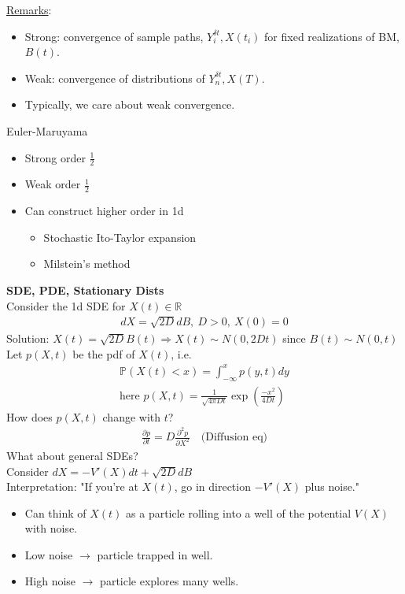 \documentclass[12pt, letterpaper]{article}
\begin{document}
\underline{Remarks}:
\begin{itemize}
    \item Strong: convergence of sample paths, $Y_i^{\delta t}, X(t_i)$ for fixed realizations
    of BM, $B(t)$.
    \item Weak: convergence of distributions of $Y_n^{\delta t}, X(T)$.
    \item Typically, we care about weak convergence.
\end{itemize}
 Euler-Maruyama
\begin{itemize}
    \item Strong order $\frac{1}{2}$
    \item Weak order $\frac{1}{2}$
    \item Can construct higher order in 1d
    \begin{itemize}
        \item Stochastic Ito-Taylor expansion
        \item Milstein's method
    \end{itemize}
\end{itemize}
\textbf{SDE, PDE, Stationary Dists}\\
Consider the 1d SDE for $X(t) \in \mathbb{R}$
\begin{align*}
    dX = \sqrt{2D}dB,\ D>0,\ X(0) = 0
\end{align*}
Solution: $X(t) = \sqrt{2D}B(t) \Rightarrow X(t) \sim N(0,2Dt)$ since $B(t) \sim N(0,t)$ \\
Let $p(X,t)$ be the pdf of $X(t)$, i.e. 
\begin{align*}
    \mathbb{P}(X(t) < x) = \int_{-\infty}^{x}p(y,t)dy \\
    \text{here } p(X,t) = \frac{1}{\sqrt{4\pi Dt}} \exp (\frac{-x^2}{4Dt})
\end{align*}
How does $p(X,t)$ change with $t$?
\begin{align*}
    \frac{\partial p}{\partial t} = D\frac{\partial^2 p}{\partial X^2} \quad \text{(Diffusion eq)}
\end{align*}
What about general SDEs? \\
Consider $dX = -V'(X)dt + \sqrt{2D}dB$ \\
Interpretation: "If you're at $X(t)$, go in direction $-V'(X)$ plus noise."
\begin{itemize}
    \item Can think of $X(t)$ as a particle rolling into a well of the potential $V(X)$ with noise.
    \item Low noise $\rightarrow$ particle trapped in well.
    \item High noise $\rightarrow$ particle explores many wells.
\end{itemize}
\end{document}
